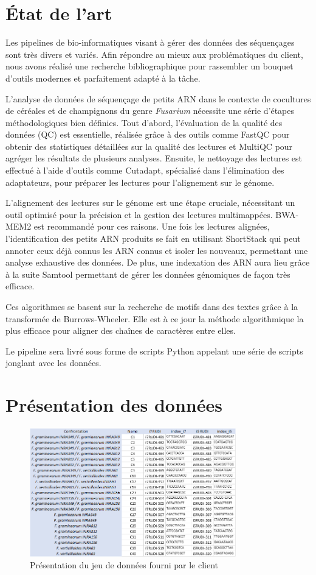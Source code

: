 \section{État de l'art}
Les pipelines de bio-informatiques visant à gérer des données des séquençages sont très divers et variés. Afin répondre au mieux aux problématiques du client, nous avons réalisé une recherche bibliographique pour rassembler un bouquet d'outils modernes et parfaitement adapté à la tâche. 

L'analyse de données de séquençage de petits ARN dans le contexte de cocultures de céréales et de champignons du genre \textit{Fusarium} nécessite une série d'étapes méthodologiques bien définies. Tout d'abord, l'évaluation de la qualité des données (QC) est essentielle, réalisée grâce à des outils comme FastQC pour obtenir des statistiques détaillées sur la qualité des lectures et MultiQC pour agréger les résultats de plusieurs analyses. Ensuite, le nettoyage des lectures est effectué à l'aide d'outils comme Cutadapt, spécialisé dans l'élimination des adaptateurs, pour préparer les lectures pour l'alignement sur le génome.

L'alignement des lectures sur le génome est une étape cruciale, nécessitant un outil optimisé pour la précision et la gestion des lectures multimappées. BWA-MEM2 est recommandé pour ces raisons. Une fois les lectures alignées, l'identification des petits ARN produits se fait en utilisant ShortStack qui peut annoter ceux déjà connus les ARN connus et isoler les nouveaux, permettant une analyse exhaustive des données. De plus, une indexation des ARN aura lieu grâce à la suite Samtool permettant de gérer les données génomiques de façon très efficace. 

Ces algorithmes se basent sur la recherche de motifs dans des textes grâce à la transformée de Burrows-Wheeler. Elle est à ce jour la méthode algorithmique la plus efficace pour aligner des chaînes de caractères entre elles. 

Le pipeline sera livré sous forme de scripts Python appelant une série de scripts jonglant avec les données.

\section{Présentation des données}

\begin{figure}[ht]
    \centering
    \includegraphics[width=0.8\textwidth]{img/dataset.png}
    \caption{Présentation du jeu de données fourni par le client}
    \label{fig:dataset}
\end{figure}

